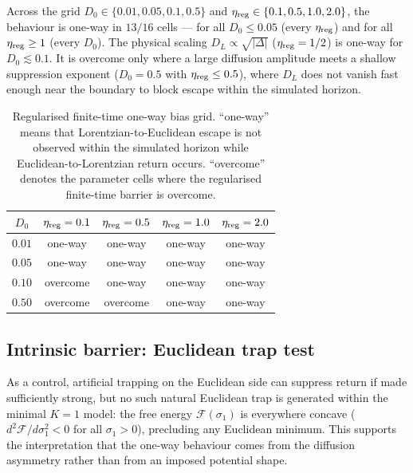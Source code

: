 \documentclass[11pt,a4paper]{article}
\theoremstyle{definition}
\begin{document}
\noindent Across the grid $D_0 \in \{0.01, 0.05, 0.1, 0.5\}$ and $\eta_{\rm reg} \in \{0.1, 0.5, 1.0, 2.0\}$, the behaviour is one-way in $13/16$ cells --- for all $D_0 \le 0.05$ (every $\eta_{\rm reg}$) and for all $\eta_{\rm reg} \ge 1$ (every $D_0$). The physical scaling $D_L \propto \sqrt{|\Delta|}$ ($\eta_{\rm reg} = 1/2$) is one-way for $D_0 \lesssim 0.1$. It is overcome only where a large diffusion amplitude meets a shallow suppression exponent ($D_0 = 0.5$ with $\eta_{\rm reg} \le 0.5$), where $D_L$ does not vanish fast enough near the boundary to block escape within the simulated horizon.

\begin{table}[ht]
\centering
\caption{Regularised finite-time one-way bias grid. ``one-way'' means
that Lorentzian-to-Euclidean escape is not observed within the simulated
horizon while Euclidean-to-Lorentzian return occurs. ``overcome'' denotes
the parameter cells where the regularised finite-time barrier is overcome.}
\label{tab:barrier_grid}
\footnotesize
\setlength{\tabcolsep}{4.5pt}
\begin{tabular}{ccccc}
\toprule
$D_0$ & $\eta_{\rm reg}=0.1$ & $\eta_{\rm reg}=0.5$ &
$\eta_{\rm reg}=1.0$ & $\eta_{\rm reg}=2.0$ \\
\midrule
$0.01$ & one-way & one-way & one-way & one-way \\
$0.05$ & one-way & one-way & one-way & one-way \\
$0.10$ & overcome & one-way & one-way & one-way \\
$0.50$ & overcome & overcome & one-way & one-way \\
\bottomrule
\end{tabular}
\end{table}

\subsection{Intrinsic barrier: Euclidean trap test}

As a control, artificial trapping on the Euclidean side can suppress
return if made sufficiently strong, but no such natural Euclidean trap is
generated within the minimal $K{=}1$ model: the free energy
$\mathcal{F}(\sigma_1)$ is everywhere concave
($d^2\mathcal{F}/d\sigma_1^2 < 0$ for all $\sigma_1 > 0$), precluding any
Euclidean minimum. This supports the interpretation that the one-way
behaviour comes from the diffusion asymmetry rather than from an imposed
potential shape.
\end{document}

